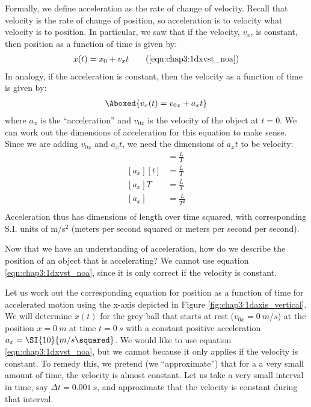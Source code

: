 Formally, we define acceleration as the rate of change of velocity. Recall that velocity is the rate of change of position, so acceleration is to velocity what velocity is to position. In particular, we saw that if the velocity, $v_x$, is constant, then position as a function of time is given by:
\begin{align}
x(t) = x_0 + v_xt \tag{\ref{eqn:chap3:1dxvst_noa}}
\end{align} 
In analogy, if the acceleration is constant, then the velocity as a function of time is given by:
\begin{align}
\label{eqn:chap3L1dvvst}
\Aboxed{v_x(t) = v_{0x} + a_xt }
\end{align}
where $a_x$ is the ``acceleration'' and $v_{0x}$ is the velocity of the object at $t=0$. We can work out the dimensions of acceleration for this equation to make sense. Since we are adding $v_{0x}$ and $a_xt$, we need the dimensions of $a_xt$ to be velocity:
\begin{align*}
[a_xt] &= \frac{L}{T} \\
[a_x][t] &= \frac{L}{T} \\
[a_x]T&= \frac{L}{T} \\
[a_x]&= \frac{L}{T^2} \\
\end{align*}
Acceleration thus has dimensions of length over time squared, with corresponding S.I. units of m/s$^2$ (meters per second squared or meters per second per second). 

Now that we have an understanding of acceleration, how do we describe the position of an object that is accelerating? We cannot use equation \ref{eqn:chap3:1dxvst_noa}, since it is only correct if the velocity is constant. 


Let us work out the corresponding equation for position as a function of time for accelerated motion using the x-axis depicted in Figure \ref{fig:chap3:1daxis_vertical}. We will determine $x(t)$ for the grey ball that starts at rest ($v_{0x}=\SI{0}{m/s}$) at the position $x=\SI{0}{m}$ at time $t=\SI{0}{s}$ with a constant positive acceleration $a_x=\SI{10}{m/s\squared}$. We would like to use equation \ref{eqn:chap3:1dxvst_noa}, but we cannot because it only applies if the velocity is constant. To remedy this, we pretend (we ``approximate'') that for a a very small amount of time, the velocity is almost constant. Let us take a very small interval in time, say $\Delta t=\SI{0.001}{s}$, and approximate that the velocity is constant during that interval. 

